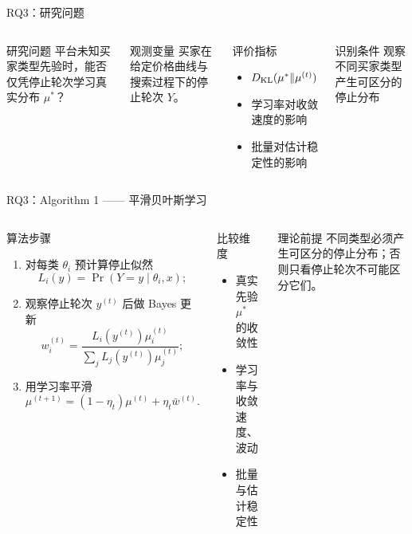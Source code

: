 \documentclass[10pt,aspectratio=169]{beamer}
\begin{document}
\begin{frame}{RQ3：研究问题}
  \begin{columns}[T,onlytextwidth]
    \begin{block}{研究问题}
      平台未知买家类型先验时，能否仅凭停止轮次学习真实分布 $\mu^*$？
    \end{block}
    \begin{block}{观测变量}
      买家在给定价格曲线与搜索过程下的停止轮次 $Y$。
    \end{block}
    \begin{block}{评价指标}
      \begin{itemize}
        \item $D_{\rm KL}(\mu^*\|\mu^{(t)})$
        \item 学习率对收敛速度的影响
        \item 批量对估计稳定性的影响
      \end{itemize}
    \end{block}
    \begin{alertblock}{识别条件}
      观察不同买家类型产生可区分的停止分布
      \end{alertblock}
      \end{columns}
\end{frame}

\begin{frame}{RQ3：Algorithm 1 —— 平滑贝叶斯学习}
  \begin{columns}[T,onlytextwidth]
    \begin{block}{算法步骤}
      \begin{enumerate}
        \item 对每类 $\theta_i$ 预计算停止似然
              \[
                L_i(y)=\Pr(Y=y\mid\theta_i,x);
              \]
        \item 观察停止轮次 $y^{(t)}$ 后做 Bayes 更新
              \[
                w_i^{(t)}=\frac{L_i(y^{(t)})\mu_i^{(t)}}{\sum_jL_j(y^{(t)})\mu_j^{(t)}};
              \]
        \item 用学习率平滑
              \[
                \mu^{(t+1)}=(1-\eta_t)\mu^{(t)}+\eta_t\bar w^{(t)}.
              \]
      \end{enumerate}
    \end{block}
    \begin{block}{比较维度}
      \begin{itemize}
        \item 真实先验 $\mu^*$ 的收敛性
        \item 学习率与收敛速度、波动
        \item 批量与估计稳定性
      \end{itemize}
    \end{block}
    \begin{alertblock}{理论前提}
      不同类型必须产生可区分的停止分布；否则只看停止轮次不可能区分它们。
    \end{alertblock}
    \end{columns}
\end{frame}
\end{document}
